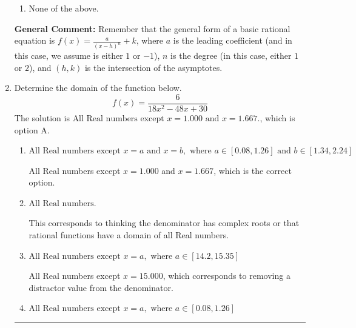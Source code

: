 \documentclass{extbook}[14pt]
\newcommand{\litem}[1]{\item #1

\rule{\textwidth}{0.4pt}}
\begin{document}
\begin{enumerate}
{\begin{enumerate}[label=\Alph*.]
\item None of the above.\end{enumerate}
\textbf{General Comment:} Remember that the general form of a basic rational equation is $ f(x) = \frac{a}{(x-h)^n} + k$, where $a$ is the leading coefficient (and in this case, we assume is either $1$ or $-1$), $n$ is the degree (in this case, either $1$ or $2$), and $(h, k)$ is the intersection of the asymptotes.
}
\litem{
Determine the domain of the function below.
\[ f(x) = \frac{6}{18x^{2} -48 x + 30} \]The solution is \( \text{All Real numbers except } x = 1.000 \text{ and } x = 1.667. \), which is option A.\begin{enumerate}[label=\Alph*.]
\item \( \text{All Real numbers except } x = a \text{ and } x = b, \text{ where } a \in [0.08, 1.26] \text{ and } b \in [1.34, 2.24] \)

All Real numbers except $x = 1.000$ and $x = 1.667$, which is the correct option.
\item \( \text{All Real numbers.} \)

This corresponds to thinking the denominator has complex roots or that rational functions have a domain of all Real numbers.
\item \( \text{All Real numbers except } x = a, \text{ where } a \in [14.2, 15.35] \)

All Real numbers except $x = 15.000$, which corresponds to removing a distractor value from the denominator.
\item \( \text{All Real numbers except } x = a, \text{ where } a \in [0.08, 1.26] \)


\end{enumerate}}
\end{enumerate}
\end{document}
